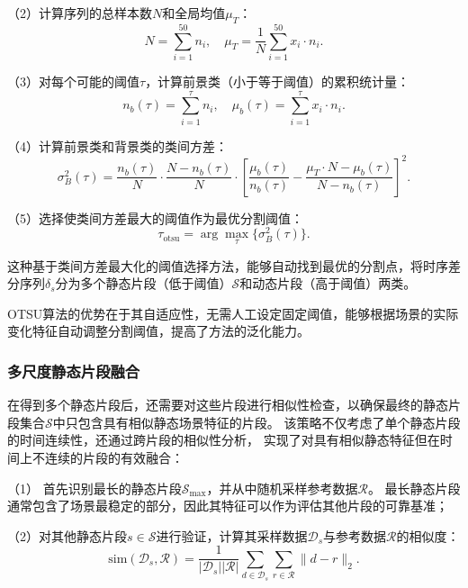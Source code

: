 （2）计算序列的总样本数$N$和全局均值$\mu_T$：
\begin{equation}
N = \sum_{i=1}^{50} n_i, \quad \mu_T = \frac{1}{N}\sum_{i=1}^{50} x_i \cdot n_i.
\end{equation}

（3）对每个可能的阈值$\tau$，计算前景类（小于等于阈值）的累积统计量：
\begin{equation}
n_b(\tau) = \sum_{i=1}^{\tau} n_i, \quad \mu_b(\tau) = \sum_{i=1}^{\tau} x_i \cdot n_i.
\end{equation}

（4）计算前景类和背景类的类间方差：
\begin{equation}
\sigma_B^2(\tau) = \frac{n_b(\tau)}{N} \cdot \frac{N-n_b(\tau)}{N} \cdot [\frac{\mu_b(\tau)}{n_b(\tau)} - \frac{\mu_T \cdot N-\mu_b(\tau)}{N-n_b(\tau)}]^2.
\end{equation}

（5）选择使类间方差最大的阈值作为最优分割阈值：
\begin{equation}
\tau_{\text{otsu}} = \arg\max_{\tau} \{\sigma_B^2(\tau)\}.
\end{equation}

这种基于类间方差最大化的阈值选择方法，能够自动找到最优的分割点，将时序差分序列$\delta_s$分为多个静态片段（低于阈值）$\mathcal{S}$和动态片段（高于阈值）两类。

OTSU算法的优势在于其自适应性，无需人工设定固定阈值，能够根据场景的实际变化特征自动调整分割阈值，提高了方法的泛化能力。

\subsubsection{多尺度静态片段融合}
在得到多个静态片段后，还需要对这些片段进行相似性检查，以确保最终的静态片段集合$\mathcal{S}$中只包含具有相似静态场景特征的片段。
该策略不仅考虑了单个静态片段的时间连续性，还通过跨片段的相似性分析，
实现了对具有相似静态特征但在时间上不连续的片段的有效融合：

（1） 首先识别最长的静态片段$\mathcal{S}_{\text{max}}$，并从中随机采样参考数据$\mathcal{R}$。
   最长静态片段通常包含了场景最稳定的部分，因此其特征可以作为评估其他片段的可靠基准；

（2）对其他静态片段$s\in\mathcal{S}$进行验证，计算其采样数据$\mathcal{D}_s$与参考数据$\mathcal{R}$的相似度：
\begin{equation}
\text{sim}(\mathcal{D}_s, \mathcal{R}) = \frac{1}{|\mathcal{D}_s||\mathcal{R}|}\sum_{d \in \mathcal{D}_s}\sum_{r \in \mathcal{R}}\|d - r\|_2.
\end{equation}

